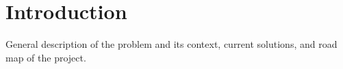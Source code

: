 
% 
% 

\section{Introduction}

General description of the problem and its context, current solutions, and road map of the project.









